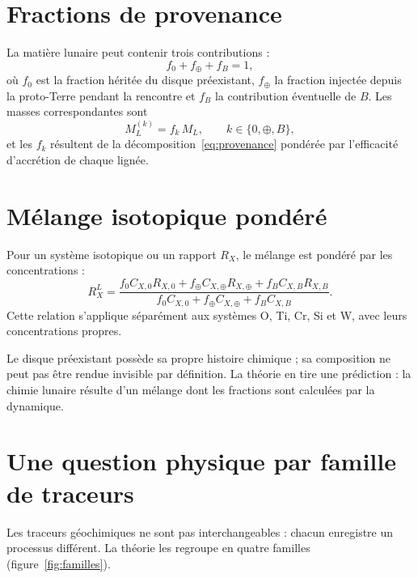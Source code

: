 \documentclass[11pt,a4paper,openany]{report}
\begin{document}
\section{Fractions de provenance}

La matière lunaire peut contenir trois contributions :
\begin{equation}
f_0+f_\oplus+f_B=1,
\label{eq:fractions}
\end{equation}
où $f_0$ est la fraction héritée du disque préexistant, $f_\oplus$ la fraction injectée depuis la
proto-Terre pendant la rencontre et $f_B$ la contribution éventuelle de $B$. Les masses
correspondantes sont
\begin{equation}
M_L^{(k)}=f_k\,M_L,\qquad k\in\{0,\oplus,B\},
\label{eq:MLk}
\end{equation}
et les $f_k$ résultent de la décomposition~\eqref{eq:provenance} pondérée par l'efficacité
d'accrétion de chaque lignée.

\section{Mélange isotopique pondéré}

Pour un système isotopique ou un rapport $R_X$, le mélange est pondéré par les concentrations :
\begin{equation}
R_X^L=\frac{f_0C_{X,0}R_{X,0}+f_\oplus C_{X,\oplus}R_{X,\oplus}+f_BC_{X,B}R_{X,B}}
{f_0C_{X,0}+f_\oplus C_{X,\oplus}+f_BC_{X,B}}.
\label{eq:melange}
\end{equation}
Cette relation s'applique séparément aux systèmes O, Ti, Cr, Si et W, avec leurs concentrations
propres.

\begin{ideephys}
Le disque préexistant possède sa propre histoire chimique ; sa composition ne peut pas être
rendue invisible par définition. La théorie en tire une prédiction : la chimie lunaire résulte d'un
mélange dont les fractions sont calculées par la dynamique.
\end{ideephys}


\section{Une question physique par famille de traceurs}

Les traceurs géochimiques ne sont pas interchangeables : chacun enregistre un processus
différent. La théorie les regroupe en quatre familles (figure~\ref{fig:familles}).
\end{document}
